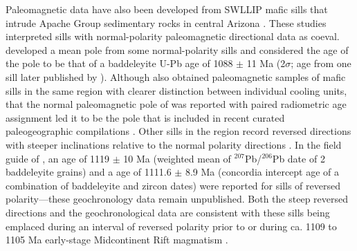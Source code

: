 Paleomagnetic data have also been developed from SWLLIP mafic sills that intrude Apache Group sedimentary rocks in central Arizona \cite{Helsley1972a, Donadini2011a}. These studies interpreted sills with normal-polarity paleomagnetic directional data as coeval.  developed a mean pole from some normal-polarity sills and considered the age of the pole to be that of a baddeleyite U-Pb age of 1088 $\pm$ 11 Ma (2$\sigma$; age from one sill later published by ). Although  also obtained paleomagnetic samples of mafic sills in the same region with clearer distinction between individual cooling units, that the normal paleomagnetic pole of  was reported with paired radiometric age assignment led it to be the pole that is included in recent curated paleogeographic compilations \cite[e.g.][]{Evans2021a}. Other sills in the region record reversed directions with steeper inclinations relative to the normal polarity directions \cite{Harlan1993a, Donadini2011a}. In the field guide of , an age of 1119 $\pm$ 10 Ma (weighted mean of $^{207}$Pb/$^{206}$Pb date of 2 baddeleyite grains) and a age of 1111.6 $\pm$ 8.9 Ma (concordia intercept age of a combination of baddeleyite and zircon dates) were reported for sills of reversed polarity---these geochronology data remain unpublished. Both the steep reversed directions and the geochronological data are consistent with these sills being emplaced during an interval of reversed polarity prior to or during ca. 1109 to 1105 Ma early-stage Midcontinent Rift magmatism \cite{Vervoort2007a, Swanson-Hysell2019a}.

